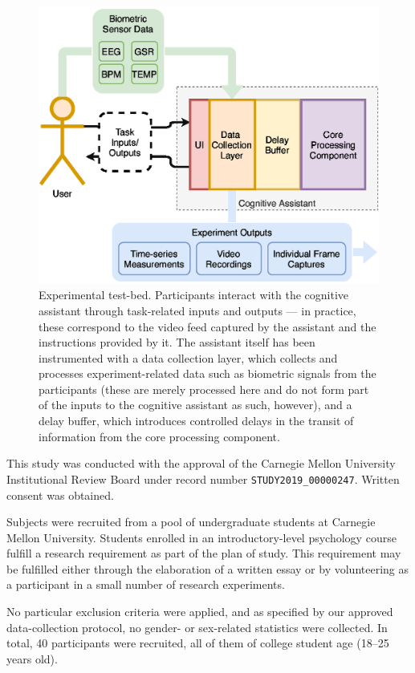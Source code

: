 \begin{figure}[h]
  \centering
  \includegraphics[width=.8\textwidth]{publications/2021ImpactDelayedResponse/Fig1.eps}
  \caption{Experimental test-bed.
  Participants interact with the cognitive assistant through task-related inputs and outputs --- in practice, these correspond to the video feed captured by the assistant and the instructions provided by it.
  The assistant itself has been instrumented with a data collection layer, which collects and processes experiment-related data such as biometric signals from the participants (these are merely processed here and do not form part of the inputs to the cognitive assistant as such, however), and a delay buffer, which introduces controlled delays in the transit of information from the core processing component.}%
  \label{fig:experimentaltestbed}
\end{figure}

This study was conducted with the approval of the Carnegie Mellon University Institutional Review Board under record number \texttt{STUDY2019\_00000247}. 
Written consent was obtained.

Subjects were recruited from a pool of undergraduate students at Carnegie Mellon University.
Students enrolled in an introductory-level psychology course fulfill a research requirement as part of the plan of study.
This requirement may be fulfilled either through the elaboration of a written essay or by volunteering as a participant in a small number of research experiments.

No particular exclusion criteria were applied, and as specified by our approved data-collection protocol, no gender- or sex-related statistics were collected.
In total, 40 participants were recruited, all of them of college student age (\numrange{18}{25} years old).


